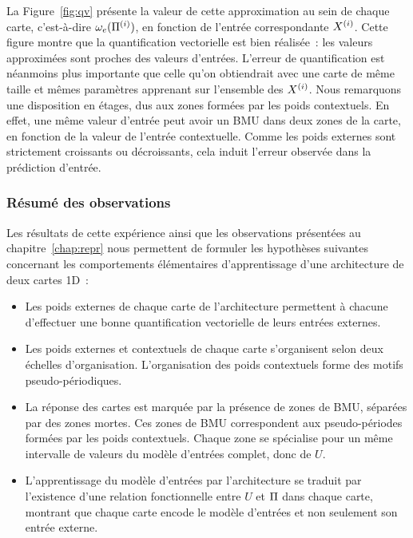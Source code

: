 \documentclass[../main]{subfiles}
\begin{document}
La Figure~\ref{fig:qv} présente la valeur de cette approximation au sein de chaque carte, c'est-à-dire $\omega_{e}(\Pi^{({i})})$, en fonction de l'entrée correspondante $X^{({i})}$. 
Cette figure montre que la quantification vectorielle est bien réalisée~: les valeurs approximées sont proches des valeurs d'entrées.
L'erreur de quantification est néanmoins plus importante que celle qu'on obtiendrait avec une carte de même taille et mêmes paramètres apprenant sur l'ensemble des $X^{({i})}$. 
Nous remarquons une disposition en étages, dus aux zones formées par les poids contextuels.
En effet, une même valeur d'entrée peut avoir un BMU dans deux zones de la carte, en fonction de la valeur de l'entrée contextuelle. 
Comme les poids externes sont strictement croissants ou décroissants, cela induit l'erreur observée dans la prédiction d'entrée.

\subsubsection{Résumé des observations}

Les résultats de cette expérience ainsi que les observations présentées au chapitre~\ref{chap:repr} nous permettent de formuler les hypothèses suivantes concernant les comportements élémentaires d'apprentissage d'une architecture de deux cartes 1D~:

\begin{itemize}
	\item Les poids externes de chaque carte de l'architecture permettent à chacune d'effectuer une bonne quantification vectorielle de leurs entrées externes.
	\item Les poids externes et contextuels de chaque carte s'organisent selon deux échelles d'organisation. L'organisation des poids contextuels forme des motifs pseudo-périodiques.
	\item La réponse des cartes est marquée par la présence de zones de BMU, séparées par des zones mortes. Ces zones de BMU correspondent aux pseudo-périodes formées par les poids contextuels. Chaque zone se spécialise pour un même intervalle de valeurs du modèle d'entrées complet, donc de $U$.
	\item L'apprentissage du modèle d'entrées par l'architecture se traduit par l'existence d'une relation fonctionnelle entre $U$ et $\Pi$ dans chaque carte, montrant que chaque carte encode le modèle d'entrées et non seulement son entrée externe.
\end{itemize}
\end{document}

